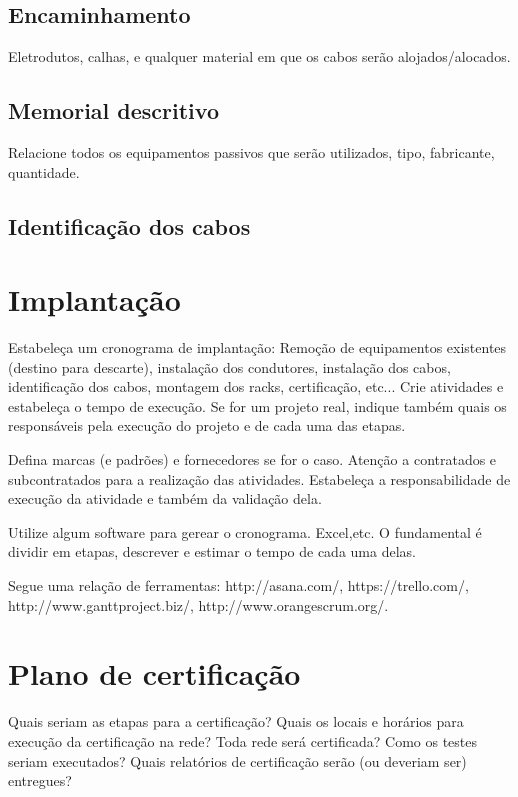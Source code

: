 \documentclass[	DIV=calc,%
							paper=a4,%
							fontsize=12pt,%
							onecolumn]{scrartcl}	 					%
\begin{document}
\subsection{Encaminhamento}
Eletrodutos, calhas, e qualquer material em que os cabos serão alojados/alocados.

\subsection{Memorial descritivo}

Relacione todos os equipamentos passivos que serão utilizados, tipo, fabricante, quantidade.

\subsection{Identificação dos cabos}

\section{Implantação}
Estabeleça um cronograma de implantação:
Remoção de equipamentos existentes (destino para descarte), instalação dos condutores, instalação dos cabos, 
identificação dos cabos, montagem dos racks, certificação, etc... Crie atividades e estabeleça o tempo de execução. Se for um projeto real, indique também quais os responsáveis pela execução do projeto e de cada uma das etapas.

Defina marcas (e padrões) e fornecedores se for o caso. Atenção a contratados e subcontratados para a realização das atividades. Estabeleça a responsabilidade de execução da atividade e também da validação dela.

Utilize algum software para gerear o cronograma. Excel,etc. O fundamental é dividir em etapas, descrever e estimar o tempo de cada uma delas.

Segue uma relação de ferramentas:
http://asana.com/, 
https://trello.com/, 
http://www.ganttproject.biz/, 
http://www.orangescrum.org/. 

\section{Plano de certificação}
Quais seriam as etapas para a certificação? 
Quais os locais e horários para execução da certificação na rede? Toda rede será certificada?
Como os testes seriam executados?
Quais relatórios de certificação serão (ou deveriam ser) entregues? 
\end{document}
